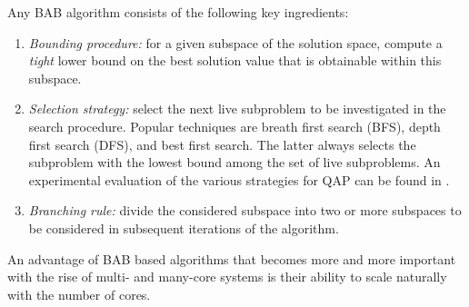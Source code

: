 Any BAB algorithm consists of the following key ingredients:
\begin{enumerate}
\item \emph{Bounding procedure:} for a given subspace of the solution
  space, compute a \emph{tight} lower bound on the best solution value
  that is obtainable within this subspace.
\item \emph{Selection strategy:} select the next live subproblem to be
  investigated in the search procedure. Popular techniques are breath
  first search (BFS), depth first search (DFS), and best first
  search. The latter always selects the subproblem with the lowest
  bound among the set of live subproblems. An experimental evaluation
  of the various strategies for QAP can be found in \cite{ClausenP99}.
\item \emph{Branching rule:} divide the considered subspace into two
  or more subspaces to be considered in subsequent iterations of the
  algorithm.
\end{enumerate}

An advantage of BAB based algorithms that becomes more and more
important with the rise of multi- and many-core systems is their
ability to scale naturally with the number of cores.

